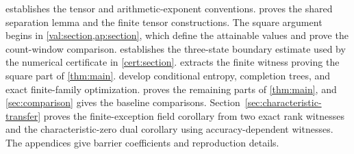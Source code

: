  establishes the tensor and arithmetic-exponent
conventions.   proves the shared separation lemma
and the finite tensor constructions.  The square argument begins in
\cref{val:section,ap:section}, which define the attainable values and
prove the count-window comparison.
 establishes the three-state boundary
estimate used by the numerical certificate in \cref{cert:section}.
 extracts the finite
witness proving the square part of \cref{thm:main}.
 develop conditional
entropy, completion trees, and exact finite-family optimization.
 proves the remaining parts of
\cref{thm:main}, and \cref{sec:comparison} gives the baseline
comparisons.  Section~\ref{sec:characteristic-transfer} proves the
finite-exception field corollary from two exact rank witnesses and
the characteristic-zero dual corollary using accuracy-dependent witnesses.
The appendices give barrier coefficients and reproduction details.

